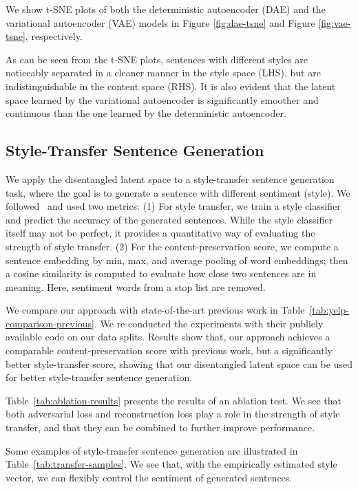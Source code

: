 \documentclass[11pt,a4paper]{article}
\begin{document}
We show t-SNE plots of both the deterministic autoencoder (DAE) and the variational autoencoder (VAE) models in Figure \ref{fig:dae-tsne} and Figure \ref{fig:vae-tsne}, respectively.


As can be seen from the t-SNE plots, sentences with different styles are noticeably separated in a cleaner manner in the style space (LHS), but are indistinguishable in the content space (RHS). It is also evident that the latent space learned by the variational autoencoder is significantly smoother and continuous than the one learned by the deterministic autoencoder.


\subsection{Style-Transfer Sentence Generation}

We apply the disentangled latent space to a style-transfer sentence generation task, where the goal is to generate a sentence with different sentiment (style). We followed~ and used two metrics: (1) For style transfer, we train a style classifier and predict the accuracy of the generated sentences. While the style classifier itself may not be perfect, it provides a quantitative way of evaluating the strength of style transfer. (2) For the content-preservation score, we compute a sentence embedding by min, max, and average pooling of word embeddings; then a cosine similarity is computed to evaluate how close two sentences are in meaning. Here, sentiment words from a stop list \cite{hu2004mining} are removed.

We compare our approach with state-of-the-art previous work in Table~\ref{tab:yelp-comparison-previous}. We re-conducted the experiments with their publicly available code on our data splits.
Results show that, our approach achieves a comparable content-preservation score with previous work, but a significantly better style-transfer score, showing that our disentangled latent space can be used for better style-transfer sentence generation.

Table~\ref{tab:ablation-results} presents the results of an ablation test. We see that both adversarial loss and reconstruction loss play a role in the strength of style transfer, and that they can be combined to further improve performance.


Some examples of style-transfer sentence generation are illustrated in Table~\ref{tab:transfer-samples}. We see that, with the empirically estimated style vector, we can flexibly control the sentiment of generated sentences.
\end{document}
